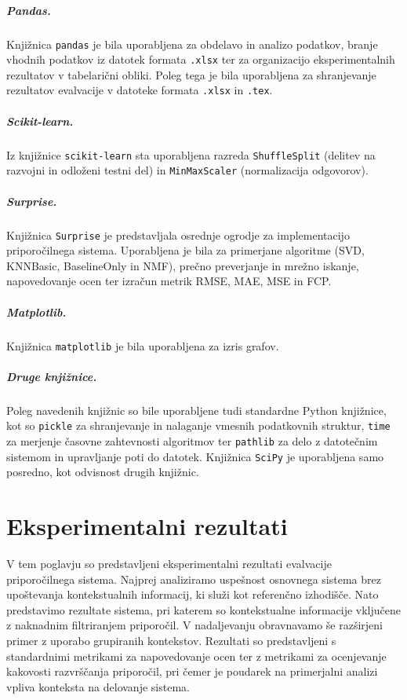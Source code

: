 \documentclass[a4paper,twoside,openright,12pt,slovene]{book}
\begin{document}
\paragraph{Pandas.}
Knjižnica \texttt{pandas} je bila uporabljena za obdelavo in analizo podatkov, branje vhodnih podatkov iz datotek formata \texttt{.xlsx} ter za organizacijo eksperimentalnih rezultatov v tabelarični obliki. Poleg tega je bila uporabljena za shranjevanje rezultatov evalvacije v datoteke formata \texttt{.xlsx} in \texttt{.tex}.

\paragraph{Scikit-learn.}
Iz knjižnice \texttt{scikit-learn} sta uporabljena razreda \texttt{ShuffleSplit} (delitev na razvojni in odloženi testni del) in \texttt{MinMaxScaler} (normalizacija odgovorov).

\paragraph{Surprise.}
Knjižnica \texttt{Surprise} je predstavljala osrednje ogrodje za implementacijo priporočilnega sistema. Uporabljena je bila za primerjane algoritme (SVD, KNNBasic, BaselineOnly in NMF), prečno preverjanje in mrežno iskanje, napovedovanje ocen ter izračun metrik RMSE, MAE, MSE in FCP.

\paragraph{Matplotlib.}
Knjižnica \texttt{matplotlib} je bila uporabljena za izris grafov.

\paragraph{Druge knjižnice.}
Poleg navedenih knjižnic so bile uporabljene tudi standardne Python knjižnice, kot so \texttt{pickle} za shranjevanje in nalaganje vmesnih podatkovnih struktur, \texttt{time} za merjenje časovne zahtevnosti algoritmov ter \texttt{pathlib} za delo z datotečnim sistemom in upravljanje poti do datotek. Knjižnica \texttt{SciPy} je uporabljena samo posredno, kot odvisnost drugih knjižnic.



\chapter{Eksperimentalni rezultati} \label{chap:results}
V tem poglavju so predstavljeni eksperimentalni rezultati evalvacije priporo\-čilnega sistema. Najprej analiziramo uspešnost osnovnega sistema brez upoštevanja kontekstualnih informacij, ki služi kot referenčno izhodišče. Nato predstavimo rezultate sistema, pri katerem so kontekstualne informacije vključene z naknadnim filtriranjem priporočil. V nadaljevanju obravnavamo še razširjeni primer z uporabo grupiranih kontekstov. Rezultati so predstavljeni s standardnimi metrikami za napovedovanje ocen ter z metrikami za ocenjevanje kakovosti razvrščanja priporočil, pri čemer je poudarek na primerjalni analizi vpliva konteksta na delovanje sistema.
\end{document}
